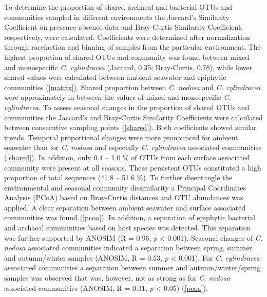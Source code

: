 \documentclass[12pt,]{article}
\begin{document}
To determine the proportion of shared archaeal and bacterial OTUs and
communities sampled in different environments the Jaccard's Similarity
Coefficient on presence-absence data and Bray-Curtis Similarity
Coefficient, respectively, were calculated. Coefficients were determined
after normalization through rarefaction and binning of samples from the
particular environment. The highest proportion of shared OTUs and
community was found between mixed and monospecific \emph{C. cylindracea}
(Jaccard, 0.35; Bray-Curtis, 0.78), while lower shared values were
calculated between ambient seawater and epiphytic communities
(\autoref{matrix}). Shared proportion between \emph{C. nodosa} and
\emph{C. cylindracea} were approximately in-between the values of mixed
and monospecific \emph{C. cylindracea}. To assess seasonal changes in
the proportion of shared OTUs and communities the Jaccard's and
Bray-Curtis Similarity Coefficients were calculated between consecutive
sampling points (\autoref{shared}). Both coefficients showed similar
trends. Temporal proportional changes were more pronounced for ambient
seawater than for \emph{C. nodosa} and especially \emph{C. cylindracea}
associated communities (\autoref{shared}). In addition, only 0.4 -- 1.0
\si{\percent} of OTUs from each surface associated community were
present at all seasons. These persistent OTUs constituted a high
proportion of total sequences (41.8 -- 51.6 \si{\percent}). To further
disentangle the environmental and seasonal community dissimilarity a
Principal Coordinates Analysis (PCoA) based on Bray-Curtis distances and
OTU abundances was applied. A clear separation between ambient seawater
and surface associated communities was found (\autoref{pcoa}). In
addition, a separation of epiphytic bacterial and archaeal communities
based on host species was detected. This separation was further
supported by ANOSIM (R = 0.96, \emph{p} \textless{} 0.001). Seasonal
changes of \emph{C. nodosa} associated communities indicated a
separation between spring, summer and autumn/winter samples (ANOSIM, R =
0.53, \emph{p} \textless{} 0.001). For \emph{C. cylindracea} associated
communities a separation between summer and autumn/winter/spring samples
was observed that was, however, not as strong as for \emph{C. nodosa}
associated communities (ANOSIM, R = 0.31, \emph{p} \textless{} 0.05)
(\autoref{pcoa}).
\end{document}
